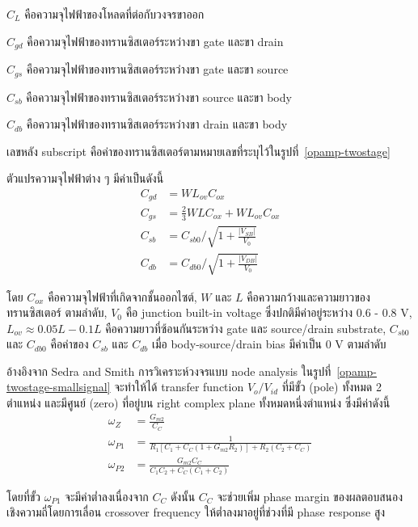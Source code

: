 \documentclass[a4paper, 11pt, oneside]{book} %
\begin{document}
$C_L$ คือความจุไฟฟ้าของโหลดที่ต่อกับวงจรขาออก

$C_{gd}$ คือความจุไฟฟ้าของทรานซิสเตอร์ระหว่างขา gate และขา drain

$C_{gs}$ คือความจุไฟฟ้าของทรานซิสเตอร์ระหว่างขา gate และขา source

$C_{sb}$ คือความจุไฟฟ้าของทรานซิสเตอร์ระหว่างขา source และขา body

$C_{db}$ คือความจุไฟฟ้าของทรานซิสเตอร์ระหว่างขา drain และขา body

เลขหลัง subscript คือค่าของทรานซิสเตอร์ตามหมายเลขที่ระบุไว้ในรูปที่~\ref{opamp-twostage}

ตัวแปรความจุไฟฟ้าต่าง ๆ มีค่าเป็นดังนี้
\begin{subequations}
    \begin{align}
        C_{gd} &= WL_{ov}C_{ox} \\
        C_{gs} &= \frac{2}{3}WLC_{ox} + WL_{ov}C_{ox} \\
        C_{sb} &= C_{sb0}/\sqrt{1+\frac{|V_{SB}|}{V_0}} \\
        C_{db} &= C_{db0}/\sqrt{1+\frac{|V_{DB}|}{V_0}}
    \end{align}
\end{subequations}

โดย $C_{ox}$ คือความจุไฟฟ้าที่เกิดจากชั้นออกไซต์, $W$ และ $L$ คือความกว้างและความยาวของทรานซิสเตอร์ ตามลำดับ, $V_0$ คือ junction built-in voltage ซึ่งปกติมีค่าอยู่ระหว่าง 0.6 - 0.8 V, $L_{ov} \approx 0.05L - 0.1L$ คือความยาวที่ซ้อนกันระหว่าง gate และ source/drain substrate, $C_{sb0}$ และ $C_{db0}$ คือค่าของ $C_{sb}$ และ $C_{db}$ เมื่อ body-source/drain bias มีค่าเป็น 0 V ตามลำดับ

อ้างอิงจาก Sedra and Smith \cite{Sedra15} การวิเคราะห์วงจรแบบ node analysis ในรูปที่~\ref{opamp-twostage-smallsignal} จะทำให้ได้ transfer function $V_{o}/V_{id}$ ที่มีขั้ว (pole) ทั้งหมด 2 ตำแหน่ง และมีศูนย์ (zero) ที่อยู่บน right complex plane ทั้งหมดหนึ่งตำแหน่ง ซึ่งมีค่าดังนี้
\begin{subequations}
    \begin{align}
        \omega_{Z} &= \frac{G_{m2}}{C_{C}} \\
        \omega_{P1} &= \frac{1}{R_1[C_1+C_C(1+G_{m2}R_2)] + R_2(C_2+C_C)} \\
        \omega_{P2} &= \frac{G_{m2}C_C}{C_1C_2 + C_C(C_1+C_2)}
    \end{align}
\end{subequations}

โดยที่ขั้ว $\omega_{P1}$ จะมีค่าต่ำลงเนื่องจาก $C_C$ ดังนั้น $C_C$ จะช่วยเพิ่ม phase margin ของผลตอบสนองเชิงความถี่โดยการเลื่อน crossover frequency ให้ต่ำลงมาอยู่ที่ช่วงที่มี phase response สูง 
\end{document}
